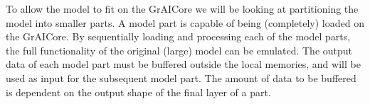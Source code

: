 To allow the model to fit on the GrAICore we will be looking at partitioning the model into smaller parts.
A model part is capable of being (completely) loaded on the GrAICore.
By sequentially loading and processing each of the model parts, the full functionality of the original (large) model can be emulated.
The output data of each model part must be buffered outside the local memories, and will be used as input for the subsequent model part.
The amount of data to be buffered is dependent on the output shape of the final layer of a part.


